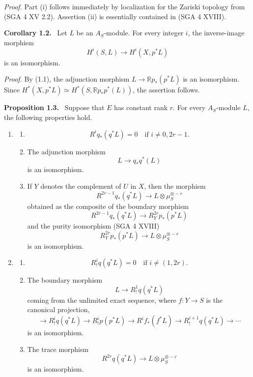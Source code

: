 \documentclass[11pt]{article}
\newenvironment{statement}[1]{\par\medskip\noindent\textbf{#1.}\ }{\par\medskip}
\begin{document}
\emph{Proof.} Part (i) follows immediately by localization for the Zariski topology from (SGA 4 XV 2.2). Assertion (ii) is essentially contained in (SGA 4 XVIII).

\begin{statement}{Corollary 1.2}
Let $L$ be an $A_S$-module. For every integer $i$, the inverse-image morphism
\[
H^i(S,L)\longrightarrow H^i(X,p^*L)
\]
is an isomorphism.
\end{statement}

\emph{Proof.} By (1.1), the adjunction morphism $L\to \mathbb{R}p_*(p^*L)$ is an isomorphism. Since $H^*(X,p^*L)\simeq H^*(S,\mathbb{R}p_*p^*(L))$, the assertion follows.

\begin{statement}{Proposition 1.3}
Suppose that $E$ has constant rank $r$. For every $A_S$-module $L$, the following properties hold.
\begin{enumerate}[label=(\roman*)]
\item
\begin{enumerate}[label=\alph*)]
\item
\[
R^i q_*(q^*L)=0\quad\text{if }i\ne 0,2r-1.
\]
\item The adjunction morphism
\[
L\longrightarrow q_*q^*(L)
\]
is an isomorphism.
\item If $Y$ denotes the complement of $U$ in $X$, then the morphism
\[
R^{2r-1}q_*(q^*L)\longrightarrow L\otimes\mu_S^{\otimes -r}
\]
obtained as the composite of the boundary morphism
\[
R^{2r-1}q_*(q^*L)\longrightarrow R_Y^{2r}p_*(p^*L)
\tag{1}
\]
and the purity isomorphism (SGA 4 XVIII)
\[
R_Y^{2r}p_*(p^*L)\longrightarrow L\otimes\mu_S^{\otimes -r}
\]
is an isomorphism.
\end{enumerate}
\item
\begin{enumerate}[label=\alph*)]
\item
\[
R_!^i q(q^*L)=0\quad\text{if }i\ne (1,2r).
\]
\item The boundary morphism
\[
L\longrightarrow R_!^1 q(q^*L)
\]
coming from the unlimited exact sequence, where $f:Y\to S$ is the canonical projection,
\[
\longrightarrow R_!^i q(q^*L)\longrightarrow R_!^i p(p^*L)
\longrightarrow R^i f_*(f^*L)\longrightarrow R_!^{i+1}q(q^*L)\longrightarrow\cdots
\]
is an isomorphism.
\item The trace morphism
\[
R^{2r}q(q^*L)\longrightarrow L\otimes\mu_S^{\otimes -r}
\]
is an isomorphism.
\end{enumerate}
\end{enumerate}
\end{statement}
\end{document}
